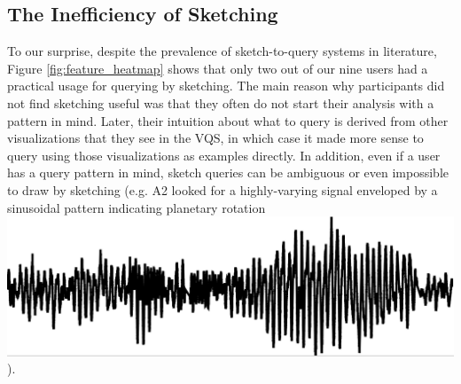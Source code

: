 \subsection{The Inefficiency of Sketching}
\par To our surprise, despite the prevalence of sketch-to-query systems in literature, Figure \ref{fig:feature_heatmap} shows that only two out of our nine users had a practical usage for querying by sketching. %
The main reason why participants did not find sketching useful was that they often do not start their analysis with a pattern in mind. Later, their intuition about what to query is derived from other visualizations that they see in the VQS, in which case it made more sense to query using those visualizations as examples directly. In addition, even if a user has a query pattern in mind, sketch queries can be ambiguous or even impossible to draw by sketching (e.g. A2 looked for a highly-varying signal enveloped by a sinusoidal pattern indicating planetary rotation \includegraphics[width=2\baselineskip,keepaspectratio]{figures/impossible_sketch.png}).
